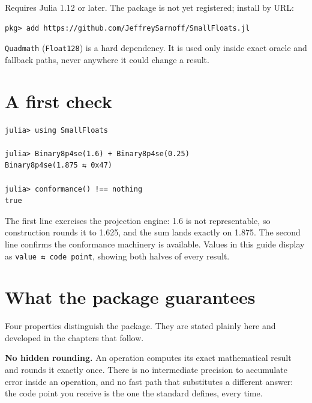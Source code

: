 \label{16848947351613073531}{}


Requires Julia 1.12 or later. The package is not yet registered; install by URL:




\nopagebreak[4]
\begin{verbatim}
pkg> add https://github.com/JeffreySarnoff/SmallFloats.jl
\end{verbatim}



\texttt{Quadmath} (\texttt{Float128}) is a hard dependency. It is used only inside exact oracle and fallback paths, never anywhere it could change a result.



\section{A first check}



\label{9269468680705793367}{}



\begin{verbatim}
julia> using SmallFloats

julia> Binary8p4se(1.6) + Binary8p4se(0.25)
Binary8p4se(1.875 ⇆ 0x47)

julia> conformance() !== nothing
true
\end{verbatim}



The first line exercises the projection engine: 1.6 is not representable, so construction rounds it to 1.625, and the sum lands exactly on 1.875. The second line confirms the conformance machinery is available. Values in this guide display as \texttt{value ⇆ code point}, showing both halves of every result.



\section{What the package guarantees}



\label{7414548155304843999}{}


Four properties distinguish the package. They are stated plainly here and developed in the chapters that follow.



\textbf{No hidden rounding.} An operation computes its exact mathematical result and rounds it exactly once. There is no intermediate precision to accumulate error inside an operation, and no fast path that substitutes a different answer: the code point you receive is the one the standard defines, every time.



